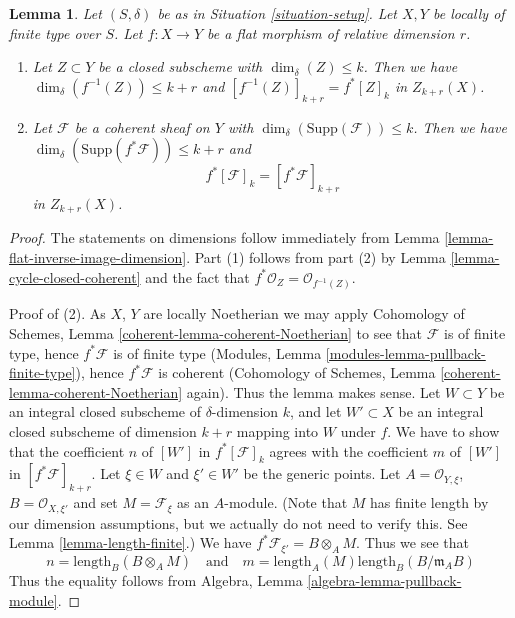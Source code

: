 \documentclass[10pt,a4paper]{amsart}
\theoremstyle{plain}
\newtheorem{lemma}[subsection]{Lemma}
\theoremstyle{definition}
\theoremstyle{remark}
\numberwithin{equation}{subsection}
\begin{document}
\begin{lemma}
\label{lemma-pullback-coherent}
Let $(S, \delta)$ be as in Situation \ref{situation-setup}.
Let $X, Y$ be locally of finite type over $S$.
Let $f : X \to Y$ be a flat morphism of relative dimension $r$.
\begin{enumerate}
\item Let $Z \subset Y$ be a closed subscheme with
$\dim_\delta(Z) \leq k$. Then we have
$\dim_\delta(f^{-1}(Z)) \leq k + r$
and $[f^{-1}(Z)]_{k + r} = f^*[Z]_k$ in $Z_{k + r}(X)$.
\item Let $\mathcal{F}$ be a coherent sheaf on $Y$ with
$\dim_\delta(\text{Supp}(\mathcal{F})) \leq k$.
Then we have $\dim_\delta(\text{Supp}(f^*\mathcal{F})) \leq k + r$
and
$$
f^*[{\mathcal F}]_k = [f^*{\mathcal F}]_{k+r}
$$
in $Z_{k + r}(X)$.
\end{enumerate}
\end{lemma}

\begin{proof}
The statements on dimensions follow immediately from
Lemma \ref{lemma-flat-inverse-image-dimension}.
Part (1) follows from part (2) by Lemma \ref{lemma-cycle-closed-coherent}
and the fact that $f^*\mathcal{O}_Z = \mathcal{O}_{f^{-1}(Z)}$.

\medskip\noindent
Proof of (2).
As $X$, $Y$ are locally Noetherian we may apply
Cohomology of Schemes, Lemma \ref{coherent-lemma-coherent-Noetherian} to see
that $\mathcal{F}$ is of finite type, hence $f^*\mathcal{F}$ is
of finite type (Modules, Lemma \ref{modules-lemma-pullback-finite-type}),
hence $f^*\mathcal{F}$ is coherent
(Cohomology of Schemes, Lemma \ref{coherent-lemma-coherent-Noetherian} again).
Thus the lemma makes sense. Let $W \subset Y$ be an integral closed
subscheme of $\delta$-dimension $k$, and let $W' \subset X$ be
an integral closed subscheme of dimension $k + r$ mapping into $W$
under $f$. We have to show that the coefficient $n$ of
$[W']$ in $f^*[{\mathcal F}]_k$ agrees with the coefficient
$m$ of $[W']$ in $[f^*{\mathcal F}]_{k+r}$. Let $\xi \in W$ and
$\xi' \in W'$ be the generic points. Let
$A = \mathcal{O}_{Y, \xi}$, $B = \mathcal{O}_{X, \xi'}$
and set $M = \mathcal{F}_\xi$ as an $A$-module. (Note that
$M$ has finite length by our dimension assumptions, but we
actually do not need to verify this. See
Lemma \ref{lemma-length-finite}.)
We have $f^*\mathcal{F}_{\xi'} = B \otimes_A M$.
Thus we see that
$$
n = \text{length}_B(B \otimes_A M)
\quad
\text{and}
\quad
m = \text{length}_A(M) \text{length}_B(B/\mathfrak m_AB)
$$
Thus the equality follows from
Algebra, Lemma \ref{algebra-lemma-pullback-module}.
\end{proof}
\end{document}
